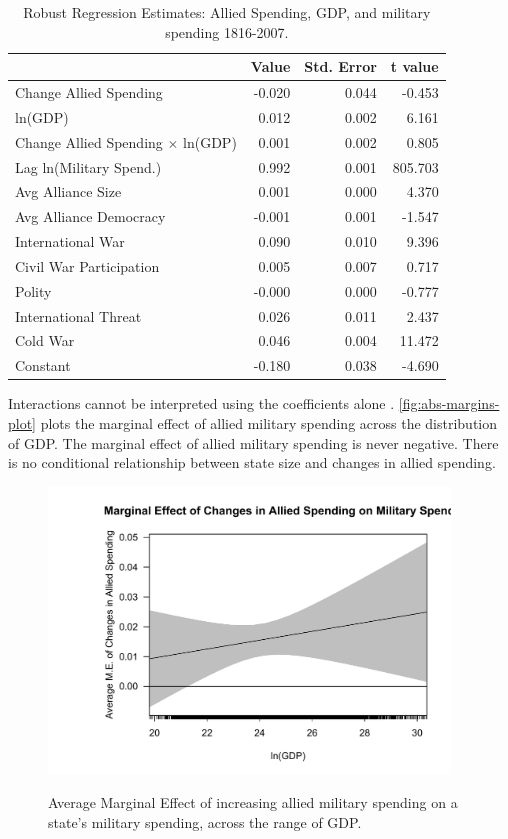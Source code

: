 \documentclass[12pt]{article}
\begin{document}
\begin{table}[ht]
\centering
\begin{tabular}{lrrr}
  \hline
 & Value & Std. Error & t value \\ 
  \hline
	Change Allied Spending & -0.020 & 0.044 & -0.453 \\ 
	ln(GDP) & 0.012 & 0.002 & 6.161 \\ 
	Change Allied Spending $\times$ ln(GDP) & 0.001 & 0.002 & 0.805 \\ 
  Lag ln(Military Spend.) & 0.992 & 0.001 & 805.703 \\ 
  Avg Alliance Size & 0.001 & 0.000 & 4.370 \\ 
  Avg Alliance Democracy & -0.001 & 0.001 & -1.547 \\ 
  International War & 0.090 & 0.010 & 9.396 \\ 
  Civil War Participation & 0.005 & 0.007 & 0.717 \\ 
  Polity & -0.000 & 0.000 & -0.777 \\ 
  International Threat & 0.026 & 0.011 & 2.437 \\ 
  Cold War & 0.046 & 0.004 & 11.472 \\
	Constant & -0.180 & 0.038 & -4.690 \\ 
   \hline
\end{tabular}
\caption{Robust Regression Estimates: Allied Spending, GDP, and military spending 1816-2007.}
\label{tab:rreg-res}
\end{table}


Interactions cannot be interpreted using the coefficients alone \citep{BramborClarkGolder2006}. 
\autoref{fig:abs-margins-plot} plots the marginal effect of allied military spending across the distribution of GDP. 
The marginal effect of allied military spending is never negative. 
There is no conditional relationship between state size and changes in allied spending. 

\begin{figure}
	\centering
		\includegraphics[width=0.95\textwidth]{abs-margins-plot.pdf}
	\label{fig:abs-margins-plot}
	\caption{Average Marginal Effect of increasing allied military spending on a state's military spending, across the range of GDP.}
\end{figure}
\end{document}
